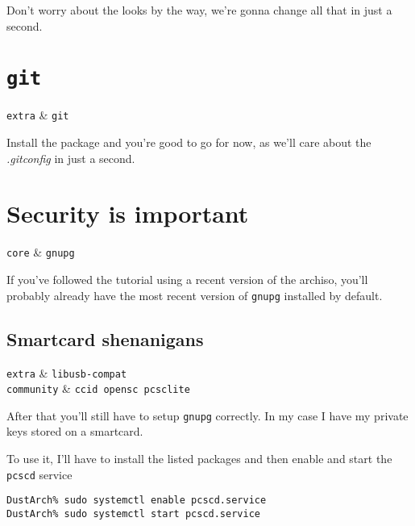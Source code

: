\documentclass[10pt]{dustdoc}
\begin{document}
Don’t worry about the looks by the way, we’re gonna change all that in just a second.

\section{\texttt{git}}
\label{sec:git}

\begin{packagetable}
    \texttt{extra} & \texttt{git} \\ 
\end{packagetable}

Install the package and you’re good to go for now, as we’ll care about the \textit{.gitconfig} in just a second.

\section{Security is important}
\label{sec:security-is-important}

\begin{packagetable}
    \texttt{core} & \texttt{gnupg} \\ 
\end{packagetable}

If you’ve followed the tutorial using a recent version of the archiso, you’ll probably already have the most recent version of \texttt{gnupg} installed by default.

\subsection{Smartcard shenanigans}
\label{sec:smartcard-shenanigans}

\begin{packagetable}
    \texttt{extra} & \texttt{libusb-compat} \\ 
    \texttt{community} & \texttt{ccid opensc pcsclite} \\ 
\end{packagetable}

After that you’ll still have to setup \texttt{gnupg} correctly.
In my case I have my private keys stored on a smartcard.

To use it, I’ll have to install the listed packages and then enable and start the \texttt{pcscd} service

\begin{verbatim}
DustArch% sudo systemctl enable pcscd.service
DustArch% sudo systemctl start pcscd.service
\end{verbatim}
\end{document}
